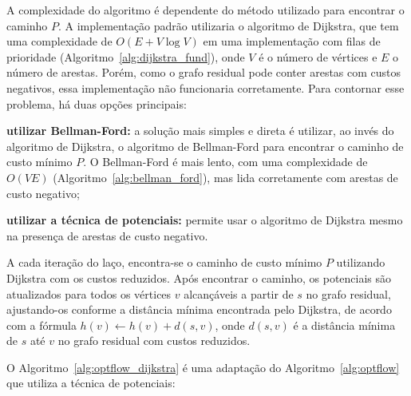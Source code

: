  A complexidade do algoritmo é dependente do método utilizado para encontrar o caminho $P$. A implementação padrão utilizaria o algoritmo de Dijkstra, que tem uma complexidade de $O(E + V \log V)$ em uma implementação com filas de prioridade (Algoritmo~\ref{alg:dijkstra_fund}), onde $V$ é o número de vértices e $E$ o número de arestas. Porém, como o grafo residual pode conter arestas com custos negativos, essa implementação não funcionaria corretamente. Para contornar esse problema, há duas opções principais:

 \begin{alineas}
    \item \textbf{utilizar Bellman-Ford:} a solução mais simples e direta é utilizar, ao invés do algoritmo de Dijkstra, o algoritmo de Bellman-Ford para encontrar o caminho de custo mínimo $P$. O Bellman-Ford é mais lento, com uma complexidade de $O(VE)$ (Algoritmo~\ref{alg:bellman_ford}), mas lida corretamente com arestas de custo negativo;
    \item \textbf{utilizar a técnica de potenciais:} permite usar o algoritmo de Dijkstra mesmo na presença de arestas de custo negativo.
    
    A cada iteração do laço, encontra-se o caminho de custo mínimo $P$ utilizando Dijkstra com os custos reduzidos. Após encontrar o caminho, os potenciais são atualizados para todos os vértices $v$ alcançáveis a partir de $s$ no grafo residual, ajustando-os conforme a distância mínima encontrada pelo Dijkstra, de acordo com a fórmula $h(v) \leftarrow h(v) + d(s,v)$, onde $d(s,v)$ é a distância mínima de $s$ até $v$ no grafo residual com custos reduzidos.
\end{alineas}

O Algoritmo~\ref{alg:optflow_dijkstra} é uma adaptação do Algoritmo~\ref{alg:optflow} que utiliza a técnica de potenciais:

